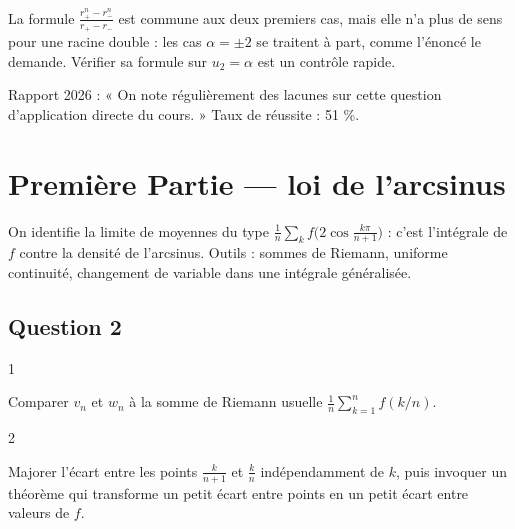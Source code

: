 \documentclass[11pt,a4paper]{article}
\newcommand{\equationajustee}[1]{%
  \sbox{\boiteequation}{$\displaystyle #1$}%
  \ifdim\wd\boiteequation>\linewidth
    \[\resizebox{\linewidth}{!}{\usebox{\boiteequation}}\]%
  \else
    \[#1\]%
  \fi}
\begin{document}
\equationajustee{\boxed{u_n=(-1)^{n+1}\,n.}}

\begin{piege}

La formule \(\frac{r_+^n-r_-^n}{r_+-r_-}\) est commune aux deux premiers cas, mais elle n'a plus de sens pour une racine double : les cas \(\alpha=\pm2\) se traitent à part, comme l'énoncé le demande. Vérifier sa formule sur \(u_2=\alpha\) est un contrôle rapide.

\end{piege}

\begin{jury}

Rapport 2026 : « On note régulièrement des lacunes sur cette question d'application directe du cours. » Taux de réussite : 51 \%.

\end{jury}

\hypertarget{premiuxe8re-partie-loi-de-larcsinus}{%
\section{Première Partie --- loi de l'arcsinus}\label{premiuxe8re-partie-loi-de-larcsinus}}

On identifie la limite de moyennes du type \(\frac1n\sum_kf\big(2\cos\frac{k\pi}{n+1}\big)\) : c'est l'intégrale de \(f\) contre la densité de l'arcsinus. Outils : sommes de Riemann, uniforme continuité, changement de variable dans une intégrale généralisée.

\hypertarget{question-2}{%
\subsection{Question 2}\label{question-2}}

\begin{indication}{1}

Comparer \(v_n\) et \(w_n\) à la somme de Riemann usuelle \(\frac1n\sum_{k=1}^nf(k/n)\).

\end{indication}

\begin{indication}{2}

Majorer l'écart entre les points \(\frac k{n+1}\) et \(\frac kn\) indépendamment de \(k\), puis invoquer un théorème qui transforme un petit écart entre points en un petit écart entre valeurs de \(f\).

\end{indication}
\end{document}
